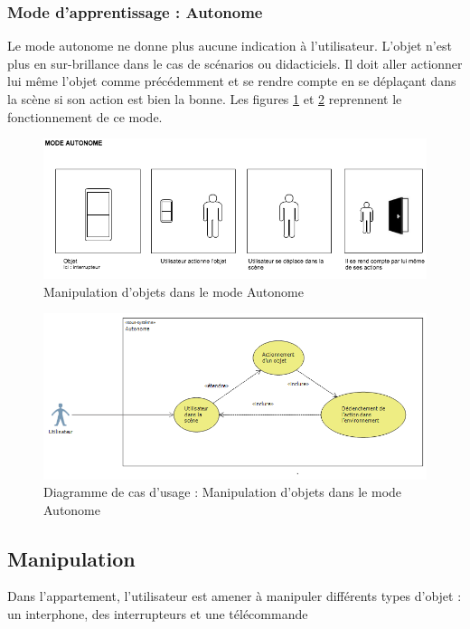 \subsubsection{Mode d'apprentissage : Autonome}

Le mode autonome ne donne plus aucune indication à l'utilisateur. L'objet n'est plus en sur-brillance dans le cas de scénarios ou didacticiels. Il doit aller actionner lui même l'objet comme précédemment et se rendre compte en se déplaçant dans la scène si son action est bien la bonne.
\newline
Les figures \ref{fig:MaquetteAutonome} et \ref{fig:CasUsageAutonome} reprennent le fonctionnement de ce mode.

\begin{figure}[h]
\centering
\includegraphics[width=1\textwidth]{2-Specifications/img-utilisateur/autonome.png}
\caption{\label{fig:MaquetteAutonome} Manipulation d'objets dans le mode Autonome }
\end{figure}
\begin{figure}[h]
\centering
\includegraphics[width=1\textwidth]{2-Specifications/img-utilisateur/cas-usage-autonome.png}
\caption{\label{fig:CasUsageAutonome} Diagramme de cas d'usage : Manipulation d'objets dans le mode Autonome }
\end{figure}
\FloatBarrier



\subsection{Manipulation}
Dans l’appartement, l’utilisateur est amener à manipuler différents types d’objet : un interphone, des interrupteurs et une télécommande

